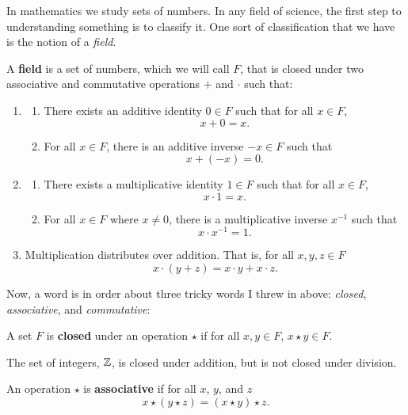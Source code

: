In mathematics we study sets of numbers. In any field of science, the first step to understanding something is to classify it. One sort of classification that we have is the notion of a \textit{field}.

\begin{definition} A \textbf{field} is a set of numbers, which we will call $F$, that is closed under two associative and commutative operations $+$ and $\cdot$ such that:
\begin{enumerate}
\item 
\begin{enumerate} 
\item There exists an additive identity $0\in F$ such that for all $x\in F$, 
\[
x+0=x.
\]
\item For all $x\in F$, there is an additive inverse $-x\in F$ such that 
\[
x+ (-x) =0.
\]
\end{enumerate}
\item \begin{enumerate}
\item There exists a multiplicative identity $1\in F$ such that for all $x\in F$, 
\[
x\cdot 1 =x.
\]
\item For all $x\in F$ where $x\ne  0$, there is a multiplicative inverse $x^{-1}$  such that 
\[
x\cdot x^{-1}= 1.
\]
\end{enumerate}
\item Multiplication distributes over addition. That is, for all $x,y,z\in F$
\[
x\cdot (y+z)=x\cdot y+x\cdot z.
\]
\end{enumerate}
\end{definition}

Now, a word is in order about three tricky words I threw in above: \textit{closed}, \textit{associative}, and \textit{commutative}: 

\begin{definition} A set $F$ is \textbf{closed} under an operation $\star$ if for all $x,y\in F$, $x\star y\in F$.   
\end{definition}

\begin{example} The set of integers, $\mathbb Z$, is closed under addition, but is not closed under division.
\end{example}

\begin{definition} An operation $\star$ is \textbf{associative} if for all $x$, $y$, and $z$
\[
x\star(y \star z) = (x \star y) \star z.
\]   
\end{definition}

